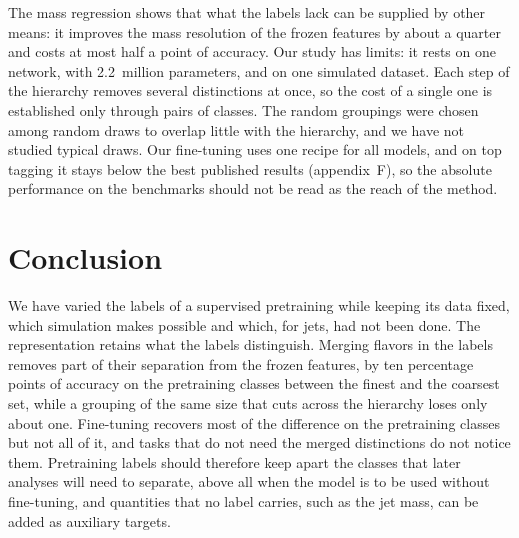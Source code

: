 \documentclass[11pt,a4paper]{article}
\newcommand{\bn}[1]{\textcolor{blue!70!black}{#1}}
\begin{document}
The mass regression shows that what the labels lack can be supplied by other means: it improves
the mass resolution of the frozen features by about a quarter and costs at most half a point of
accuracy.
Our study has limits: it rests on one network, with \bn{2.2}~million parameters, and on one
simulated dataset.
Each step of the hierarchy removes several distinctions at once, so the cost of a single one is
established only through pairs of classes.
The random groupings were chosen among random draws to overlap little with the hierarchy, and we
have not studied typical draws.
Our fine-tuning uses one recipe for all models, and on top tagging it stays below the best
published results (appendix~F), so the absolute performance on the benchmarks should not be read
as the reach of the method.

\section{Conclusion}

We have varied the labels of a supervised pretraining while keeping its data fixed, which
simulation makes possible and which, for jets, had not been done.
The representation retains what the labels distinguish.
Merging flavors in the labels removes part of their separation from the frozen features, by ten
percentage points of accuracy on the pretraining classes between the finest and the coarsest set,
while a grouping of the same size that cuts across the hierarchy loses only about one.
Fine-tuning recovers most of the difference on the pretraining classes but not all of it, and
tasks that do not need the merged distinctions do not notice them.
Pretraining labels should therefore keep apart the classes that later analyses will need to
separate, above all when the model is to be used without fine-tuning, and quantities that no
label carries, such as the jet mass, can be added as auxiliary targets.

\end{document}
